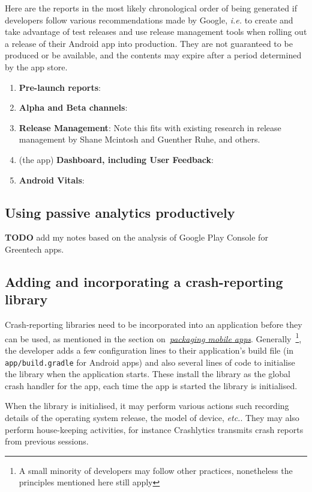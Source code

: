 Here are the reports in the most likely chronological order of being generated if developers follow various recommendations made by Google, \emph{i.e.} to create and take advantage of test releases and use release management tools when rolling out a release of their Android app into production. They are not guaranteed to be produced or be available, and the contents may expire after a period determined by the app store.

\begin{enumerate}
    \item \textbf{Pre-launch reports}: 
    \item \textbf{Alpha and Beta channels}:
    \item \textbf{Release Management}: Note this fits with existing research in release management by Shane Mcintosh and Guenther Ruhe, and others.
    
    \item (the app) \textbf{Dashboard, including User Feedback}:
    \item \textbf{Android Vitals}:
\end{enumerate}

\subsection{Using passive analytics productively}

\textbf{TODO} add my notes based on the analysis of Google Play Console for Greentech apps.

\subsection{Adding and incorporating a crash-reporting library}
Crash-reporting libraries need to be incorporated into an application before they can be used, as mentioned in the section on~\href{section-packaging-mobile-apps}{\emph{packaging mobile apps}}. Generally~\footnote{A small minority of developers may follow other practices, nonetheless the principles mentioned here still apply}, the developer adds a few configuration lines to their application's build file (in \texttt{app/build.gradle} for Android apps) and also several lines of code to initialise the library when the application starts. These install the library as the global crash handler for the app, each time the app is started the library is initialised. 

When the library is initialised, it may perform various actions such recording details of the operating system release, the model of device, \emph{etc.}. They may also perform house-keeping activities, for instance Crashlytics transmits crash reports from previous sessions.

